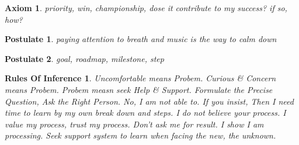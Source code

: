 \documentclass{article}
\newtheorem{axiom}{Axiom}
\newtheorem{postulate}{Postulate}
\newtheorem{rules of inference}{Rules Of Inference}
\begin{document}
\begin{axiom}
    priority,
    win, championship,
    dose it contribute to my success? if so, how?
\end{axiom}

\begin{postulate}
    paying attention to breath and music is the way to calm down
\end{postulate}

\begin{postulate}
    goal,
    roadmap,
    milestone,
    step
\end{postulate}

\begin{rules of inference}
    Uncomfortable means Probem.
    Curious & Concern means Probem.
    Probem measn seek Help & Support.
    Formulate the Precise Question, Ask the Right Person.
    No, I am not able to. If you insist,
    Then I need time to learn by my own break down and steps.
    I do not believe your process.
    I value my process, trust my process.
    Don't ask me for result. I show I am  processing.
    Seek support system to learn when facing the new, the unknown.
\end{rules of inference}
\end{document}
